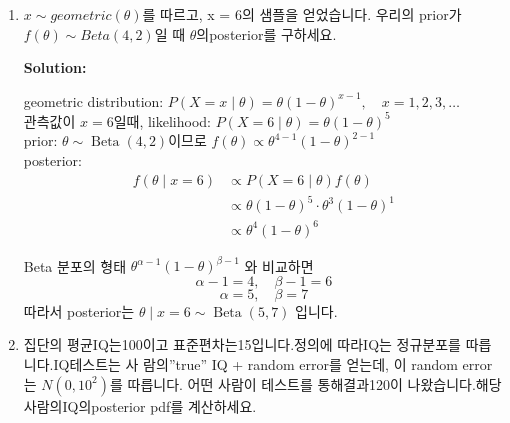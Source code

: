 \documentclass{article}
\newenvironment{solution}
{
    \par\medskip
    \noindent\textbf{Solution:}
    \begin{adjustwidth}{1em}{0em}
}
{
    \end{adjustwidth}
    \medskip
}
\begin{document}
\begin{enumerate}[label=\textbf{\arabic*.}, leftmargin=*]
\begin{solution}
\begin{enumerate}[label=(\alph*), leftmargin=2em, itemsep=1em]
            $P(8\mid 7)$를 계산하면:
            \begin{align*}
            P(8\mid 7)&=\frac18\cdot\frac{15}{28}+\frac1{12}\cdot\frac{10}{28}+\frac1{20}\cdot\frac3{28}   \\
            &=\frac{15}{224}+\frac{10}{336}+\frac3{560}\\
            &=\frac{49}{480}                 
            \end{align*}  
 
              
            따라서 두 번째 굴림에서 $8$이 나올 posterior predictive probability는 49/480      입니다.
            
        \end{enumerate}
    \end{solution}

\newpage

\item  $x \sim geometric(\theta)$를 따르고, x = 6의 샘플을 얻었습니다. 우리의 prior가 $f(\theta) \sim Beta(4,2)$일 때 $\theta$의posterior를 구하세요.

    \begin{solution}
        geometric distribution: $P(X=x\mid \theta)=\theta(1-\theta)^{x-1},\quad x=1,2,3,\dots$\\  
        관측값이 $x=6$일때, likelihood: $P(X=6\mid \theta)=\theta(1-\theta)^5$\\  
        prior: $\theta\sim \operatorname{Beta}(4,2)$이므로 $f(\theta)\propto \theta^{4-1}(1-\theta)^{2-1}$\\  
        posterior:  
        \begin{align*}
            f(\theta\mid x=6)&\propto P(X=6\mid \theta)f(\theta)  \\
            &\propto \theta(1-\theta)^5\cdot \theta^3(1-\theta)^1  \\ 
            &\propto \theta^4(1-\theta)^6 
        \end{align*}
    
        Beta 분포의 형태 $\theta^{\alpha-1}(1-\theta)^{\beta-1}$ 와 비교하면  
        $$  
        \alpha-1=4,\quad \beta-1=6  
        $$  
        $$  
        \alpha=5,\quad \beta=7  
        $$  
        따라서 posterior는 $\theta\mid x=6\sim \operatorname{Beta}(5,7)$ 입니다.                                               
    \end{solution}
\newpage
\item 집단의 평균IQ는100이고 표준편차는15입니다.정의에 따라IQ는 정규분포를 따릅니다.IQ테스트는 사
람의”true” IQ + random error를 얻는데, 이 random error는 $N(0,10^2)$를 따릅니다. 어떤 사람이 테스트를 통해결과120이 나왔습니다.해당 사람의IQ의posterior pdf를 계산하세요.


\end{enumerate}
\end{document}
